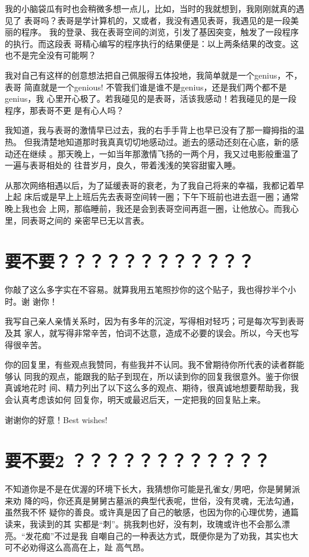 \documentclass[12pt]{book}
\begin{document}
我的小脑袋瓜有时也会稍微多想一点儿，比如，当时的我就想到，我刚刚就真的遇见了
表哥吗？表哥是学计算机的，又或者，我没有遇见表哥，我遇见的是一段美丽的程序。
我的登录、我在表哥空间的浏览，引发了基因突变，触发了一段程序的执行。而这段表
哥精心编写的程序执行的结果便是：以上两条结果的改变。这也不是完全没有可能啊？

我对自己有这样的创意想法把自己佩服得五体投地，我简单就是一个genius，不，表哥
简直就是一个genious! 不管我们谁是谁不是genius，还是我们两个都不是genius，我
心里开心极了。若我碰见的是表哥，活该我感动！若我碰见的是一段程序，那表哥不更
是有心人吗？

我知道，我与表哥的激情早已过去，我的右手手背上也早已没有了那一瓣拇指的温热。
但我清楚地知道那时我真真切切地感动过。逝去的感动还刻在心底，新的感动还在继续
。那天晚上，一如当年那激情飞扬的一两个月，我又过电影般重温了一遍与表哥相处的
往昔岁月，良久，带着浅浅的笑容甜蜜入睡。

从那次网络相遇以后，为了延缓表哥的衰老，为了我自己将来的幸福，我都记着早上起
床后或是早上上班后先去表哥空间转一圈；下午下班前也进去逛一圈；通常晚上我也会
上网，那临睡前，我还是会到表哥空间再逛一圈，让他放心。而我心里，同表哥之间的
亲密早已无以言表。
\section{要不要？？？？？？？？？？？？}
\label{sec-9-64}
你敲了这么多字实在不容易。就算我用五笔照抄你的这个贴子，我也得抄半个小时。谢
谢你！

我写自己亲人亲情关系时，因为有多年的沉淀，写得相对轻巧；可是每次写到表哥及其
家人，就写得非常辛苦，怕词不达意，造成不必要的误会。所以，今天也写得很辛苦。

你的回复里，有些观点我赞同，有些我并不认同。我不曾期待你所代表的读者群能够认
同我的观点，能跟我的贴子到现在，所以读到你的回复我很意外。鉴于你很真诚地花时
间、精力列出了以下这么多的观点、期待，很真诚地想要帮助我，我会认真考虑该如何
回复你，明天或最迟后天，一定把我的回复贴上来。

谢谢你的好意！Best wishes!
\section{要不要2 ？？？？？？？？？？？？}
\label{sec-9-65}
不知道你是不是在优渥的环境下长大，我猜想你可能是孔雀女/男吧，你是舅舅派来劝
降的吗，你还真是舅舅古墓派的典型代表呢，世俗，没有灵魂，无法勾通，虽然我不怀
疑你的善良。或许真是因了自己的敏感，也因为你的心理优势，通篇读来，我读到的其
实都是“刺”。挑我刺也好，没有刺，玫瑰或许也不会那么漂亮。“发花痴”不过是我
自嘲自己的一种表达方式，既便你是为了劝我，其实也大可不必劝得这么高高在上，趾
高气昂。
\end{document}
